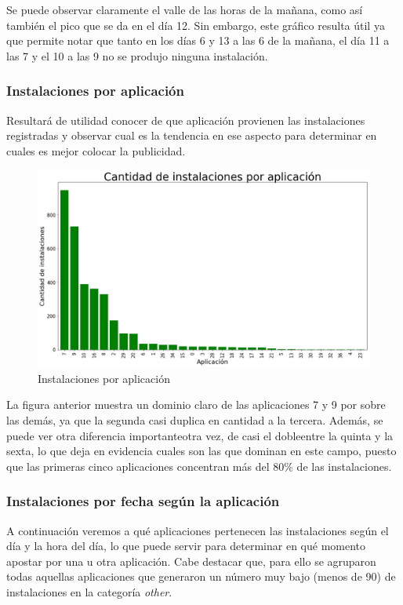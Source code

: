 \documentclass[a4paper, 12pt]{article}
\begin{document}
		Se puede observar claramente el valle de las horas de la mañana, como así también el pico que se da en el día 12. Sin embargo, este gráfico resulta útil ya que permite notar que tanto en los días 6 y 13 a las 6 de la mañana, el día 11 a las 7 y el 10 a las 9 no se produjo ninguna instalación.
		
	\subsubsection{Instalaciones por aplicación} \label{aplicaciones}
		Resultará de utilidad conocer de que aplicación provienen las instalaciones registradas y observar cual es la tendencia en ese aspecto para determinar en cuales es mejor colocar la publicidad.
		
		\FloatBarrier
		\begin{figure}[h]
			\centering
			\includegraphics[width = \textwidth]{images/installs/aplicacionesvc.png}
			\caption{Instalaciones por aplicación}
		\end{figure}
		\FloatBarrier
		
		La figura anterior muestra un dominio claro de las aplicaciones 7 y 9 por sobre las demás, ya que la segunda casi duplica en cantidad a la tercera. Además, se puede ver otra diferencia importante{\textemdash}otra vez, de casi el doble{\textemdash}entre la quinta y la sexta, lo que deja en evidencia cuales son las que dominan en este campo, puesto que las primeras cinco aplicaciones concentran más del 80\% de las instalaciones.
		
	\subsubsection{Instalaciones por fecha según la aplicación}
		A continuación veremos a qué aplicaciones pertenecen las instalaciones según el día y la hora del día, lo que puede servir para determinar en qué momento apostar por una u otra aplicación. Cabe destacar que, para ello se agruparon todas aquellas aplicaciones que generaron un número muy bajo (menos de 90) de instalaciones en la categoría \textit{other}.
		
\end{document}
